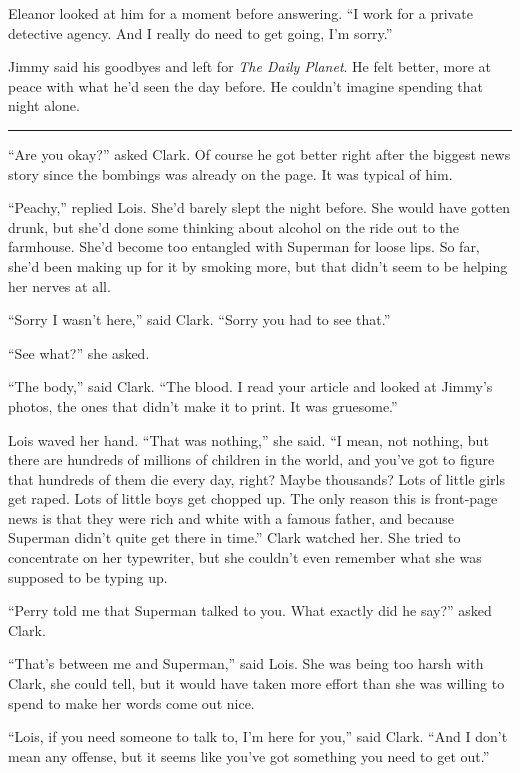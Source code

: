 Eleanor looked at him for a moment before answering. ``I work for a
private detective agency. And I really do need to get going, I'm
sorry.''

Jimmy said his goodbyes and left for \emph{The Daily Planet}. He felt
better, more at peace with what he'd seen the day before. He couldn't
imagine spending that night alone.

\begin{center}\rule{0.5\linewidth}{\linethickness}\end{center}

``Are you okay?'' asked Clark. Of course he got better right after the
biggest news story since the bombings was already on the page. It was
typical of him.

``Peachy,'' replied Lois. She'd barely slept the night before. She would
have gotten drunk, but she'd done some thinking about alcohol on the
ride out to the farmhouse. She'd become too entangled with Superman for
loose lips. So far, she'd been making up for it by smoking more, but
that didn't seem to be helping her nerves at all.

``Sorry I wasn't here,'' said Clark. ``Sorry you had to see that.''

``See what?'' she asked.

``The body,'' said Clark. ``The blood. I read your article and looked at
Jimmy's photos, the ones that didn't make it to print. It was
gruesome.''

Lois waved her hand. ``That was nothing,'' she said. ``I mean, not
nothing, but there are hundreds of millions of children in the world,
and you've got to figure that hundreds of them die every day, right?
Maybe thousands? Lots of little girls get raped. Lots of little boys get
chopped up. The only reason this is front‐page news is that they were
rich and white with a famous father, and because Superman didn't quite
get there in time.'' Clark watched her. She tried to concentrate on her
typewriter, but she couldn't even remember what she was supposed to be
typing up.

``Perry told me that Superman talked to you. What exactly did he say?''
asked Clark.

``That's between me and Superman,'' said Lois. She was being too harsh
with Clark, she could tell, but it would have taken more effort than she
was willing to spend to make her words come out nice.

``Lois, if you need someone to talk to, I'm here for you,'' said Clark.
``And I don't mean any offense, but it seems like you've got something
you need to get out.''

